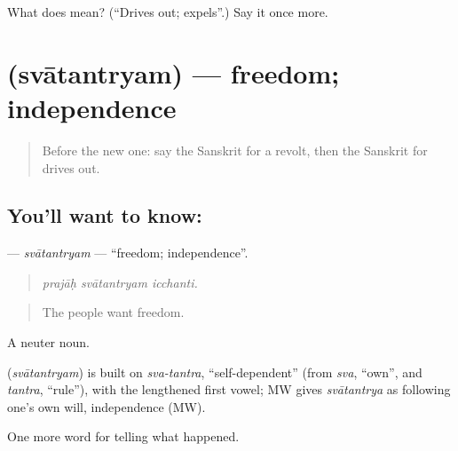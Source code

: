 \begin{tcolorbox}[breakable,colback=teal!4,colframe=teal!35!black,title={Before you move on}]
What does  mean? (\textquotedblleft{}Drives out; expels\textquotedblright{}.) Say it once more.
\end{tcolorbox}
\section[\texorpdfstring{\sk{स्वातन्त्र्यम्} (svātantryam)}{स्वातन्त्र्यम् (svātantryam)}]{ (svātantryam) — freedom; independence}

\label{lesson:SA-C320-svatantryam}



\begin{quote}
Before the new one: say the Sanskrit for a revolt, then the Sanskrit for drives out.
\end{quote}

\subsection*{You'll want to know: }
\textbf{} — \emph{svātantryam} — \textquotedblleft{}freedom; independence\textquotedblright{}.

\begin{quote}
  
\end{quote}

\begin{quote}
\emph{prajāḥ svātantryam icchanti.}
\end{quote}

\begin{quote}
The people want freedom.
\end{quote}

A neuter noun.

\begin{cousinweb}
\textbf{} (\emph{svātantryam}) is built on \emph{sva-tantra}, \textquotedblleft{}self-dependent\textquotedblright{} (from \emph{sva}, \textquotedblleft{}own\textquotedblright{}, and \emph{tantra}, \textquotedblleft{}rule\textquotedblright{}), with the lengthened first vowel; MW gives \emph{svātantrya} as following one's own will, independence (MW).
\end{cousinweb}

\begin{grammarlens}[title={What you've built}]
One more word for telling what happened.
\end{grammarlens}

